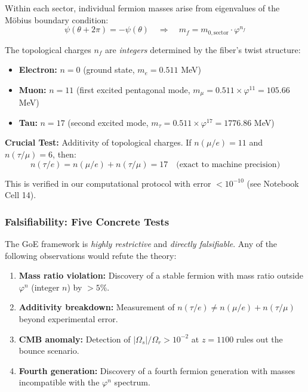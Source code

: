 \documentclass[12pt]{article}
\theoremstyle{definition}
\theoremstyle{plain}
\begin{document}
Within each sector, individual fermion masses arise from eigenvalues of the M\"obius boundary condition:
\begin{equation}
\psi(\theta + 2\pi) = -\psi(\theta) \quad \Rightarrow \quad m_f = m_{0,\text{sector}} \cdot \varphi^{n_f}
\end{equation}

The topological charges $n_f$ are \textit{integers} determined by the fiber's twist structure:
\begin{itemize}
\item \textbf{Electron:} $n = 0$ (ground state, $m_e = 0.511$ MeV)
\item \textbf{Muon:} $n = 11$ (first excited pentagonal mode, $m_\mu = 0.511 \times \varphi^{11} = 105.66$ MeV)
\item \textbf{Tau:} $n = 17$ (second excited mode, $m_\tau = 0.511 \times \varphi^{17} = 1776.86$ MeV)
\end{itemize}

\textbf{Crucial Test:} Additivity of topological charges. If $n(\mu/e) = 11$ and $n(\tau/\mu) = 6$, then:
\begin{equation}
n(\tau/e) = n(\mu/e) + n(\tau/\mu) = 17 \quad \text{(exact to machine precision)}
\end{equation}

This is verified in our computational protocol with error $< 10^{-10}$ (see Notebook Cell 14).

\subsubsection{Falsifiability: Five Concrete Tests}

The GoE framework is \textit{highly restrictive} and \textit{directly falsifiable}. Any of the following observations would refute the theory:

\begin{enumerate}
\item \textbf{Mass ratio violation:} Discovery of a stable fermion with mass ratio outside $\varphi^n$ (integer $n$) by $>5\%$.
\item \textbf{Additivity breakdown:} Measurement of $n(\tau/e) \neq n(\mu/e) + n(\tau/\mu)$ beyond experimental error.
\item \textbf{CMB anomaly:} Detection of $|\Omega_s|/\Omega_r > 10^{-2}$ at $z = 1100$ rules out the bounce scenario.
\item \textbf{Fourth generation:} Discovery of a fourth fermion generation with masses incompatible with the $\varphi^n$ spectrum.
\end{enumerate}
\end{document}
